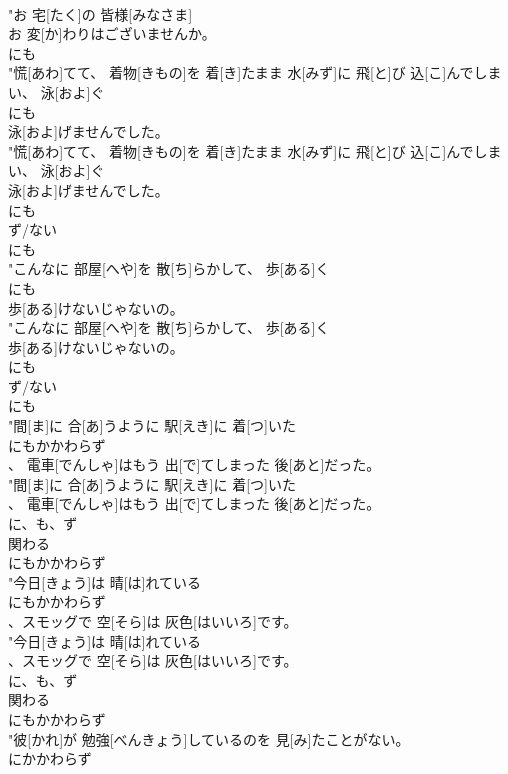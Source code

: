 \documentclass[8pt]{extreport}
\begin{document}
\begin{CJK}{UTF8}{min}
\\	"お 宅[たく]の 皆様[みなさま]
\\	お 変[か]わりはございませんか。
\\	にも
\\	"慌[あわ]てて、 着物[きもの]を 着[き]たまま 水[みず]に 飛[と]び 込[こ]んでしまい、 泳[およ]ぐ
\\	にも
\\	泳[およ]げませんでした。
\\	"慌[あわ]てて、 着物[きもの]を 着[き]たまま 水[みず]に 飛[と]び 込[こ]んでしまい、 泳[およ]ぐ
\\	泳[およ]げませんでした。
\\	にも 
\\	ず/ない 
\\	にも
\\	"こんなに 部屋[へや]を 散[ち]らかして、 歩[ある]く
\\	にも
\\	歩[ある]けないじゃないの。
\\	"こんなに 部屋[へや]を 散[ち]らかして、 歩[ある]く
\\	歩[ある]けないじゃないの。
\\	にも 
\\	ず/ない 
\\	にも
\\	"間[ま]に 合[あ]うように 駅[えき]に 着[つ]いた
\\	にもかかわらず
\\	、 電車[でんしゃ]はもう 出[で]てしまった 後[あと]だった。
\\	"間[ま]に 合[あ]うように 駅[えき]に 着[つ]いた
\\	、 電車[でんしゃ]はもう 出[で]てしまった 後[あと]だった。
\\	に、も、ず 
\\	関わる 
\\	にもかかわらず
\\	"今日[きょう]は 晴[は]れている
\\	にもかかわらず
\\	、スモッグで 空[そら]は 灰色[はいいろ]です。
\\	"今日[きょう]は 晴[は]れている
\\	、スモッグで 空[そら]は 灰色[はいいろ]です。
\\	に、も、ず 
\\	関わる 
\\	にもかかわらず
\\	"彼[かれ]が 勉強[べんきょう]しているのを 見[み]たことがない。
\\	にかかわらず

\end{CJK}
\end{document}
